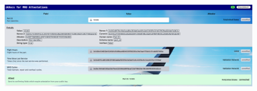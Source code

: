 \begin{figure}[H]
	\centering
		\includegraphics[width=1.0\textwidth]{Pictures/faa_attest_page.png}
\end{figure}